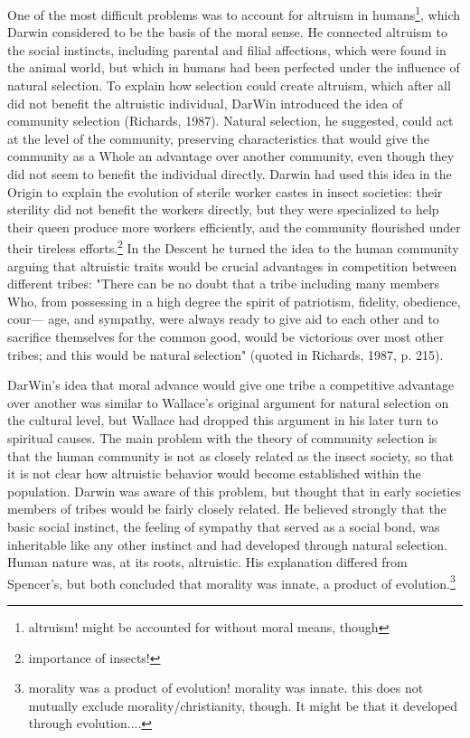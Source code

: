 \documentclass[12pt]{letter}
\begin{document}
One of the most difficult problems was to account for altruism in humans\footnote{altruism! might be accounted for without moral means, though}, which Darwin considered to be the basis of the moral sense. He connected altruism to the social instincts, including parental and filial affections, which were found in the animal world, but which in humans had been perfected under the influence of natural selection. To explain how selection could create altruism, which after all did not benefit the altruistic individual, DarWin introduced the idea of community selection (Richards, 1987). Natural selection, he suggested, could act at the level of the community, preserving characteristics that would give the community as a Whole an advantage over another community, even though they did not seem to benefit the individual directly. Darwin had used this idea in the Origin to explain the evolution of sterile worker castes in insect societies: their sterility did not benefit the workers directly, but they were specialized to help their queen produce more workers efficiently, and the community flourished under their tireless efforts.\footnote{importance of insects!} In the Descent he turned the idea to the human community arguing that altruistic traits would be crucial advantages in competition between different tribes: "There can be no doubt that a tribe including many members Who, from possessing in a high degree the spirit of patriotism, fidelity, obedience, cour— age, and sympathy, were always ready to give aid to each other and to sacrifice themselves for the common good, would be victorious over most other tribes; and this would be natural selection" (quoted in Richards, 1987, p. 215).

DarWin’s idea that moral advance would give one tribe a competitive advantage over another was similar to Wallace's original argument for natural selection on the cultural level, but Wallace had dropped this argument in his later turn to spiritual causes. The main problem with the theory of community selection is that the human community is not as closely related as the insect society, so that it is not clear how altruistic behavior would become established within the population. Darwin was aware of this problem, but thought that in early societies members of tribes would be fairly closely related. He believed strongly that the basic social instinct, the feeling of sympathy that served as a social bond, was inheritable like any other instinct and had developed through natural selection. Human nature was, at its roots, altruistic. His explanation differed from Spencer's, but both concluded that morality was innate, a product of evolution.\footnote{morality was a product of evolution! morality was innate. this does not mutually exclude morality/christianity, though. It might be that it developed through evolution....}
\end{document}
